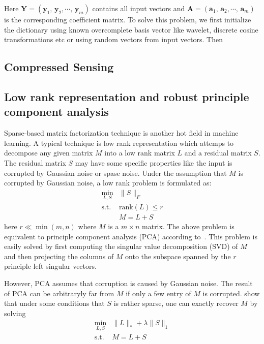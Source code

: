 Here $\mathbf{Y}=(\mathbf{y}_1,\,\mathbf{y}_2,\cdots ,\,\mathbf{y}_m)$ contains all input vectors and $\mathbf{A} = (\mathbf{a}_1,\,\mathbf{a}_2,\cdots ,\,\mathbf{a}_m)$ is the corresponding coefficient matrix.
To solve this problem, we first initialize the dictionary using known overcomplete basis vector like wavelet, discrete cosine transformations etc or using random vectors from  input vectors.
Then

\subsection{Compressed Sensing}

\subsection{Low rank representation and robust principle component analysis}
Sparse-based matrix factorization technique is another hot field in machine learning.
A typical technique is low rank representation which attemps to decompose any given matrix $M$ into a low rank matrix $L$ and a residual matrix $S$.
The residual matrix $S$ may have some specific properties like the input is corrupted by Gaussian noise or spase noise.
Under the assumption that $M$ is corrupted by Gaussian noise, a low rank problem is formulated as:
\begin{equation}
\label{eq-lowrank}
\begin{array}{cl}
\min_{L,S} & \|S\|_F\\
\mathrm{s.t.} & \mathrm{rank}(L)\leq r\\
&M=L+S
\end{array}
\end{equation}
here $r\ll \min(m,n)$ where $M$ is a $m\times n$ matrix.
The above problem is equivalent to principle component analysis (PCA) according to~\cite{jolliffe2005principal,wold1987principal}.
This problem is easily solved by first computing the singular value decomposition (SVD) of $M$ and then projecting the columns of $M$ onto the subspace spanned by the $r$ principle left singular vectors.

However, PCA assumes that corruption is caused by Gaussian noise.
The result of PCA can be arbitraryly far from $M$ if only a few entry of $M$ is corrupted.
\cite{wright2009robust,candes2011robust} show that under some conditions that $S$ is rather sparse, one can exactly recover $M$ by solving
\begin{equation}
\label{eq-lowranksparse}
\begin{array}{cl}
\min_{L,S} & \|L\|_* + \lambda \|S\|_1 \\
\mathrm{s.t.} & M = L+S
\end{array}
\end{equation}

